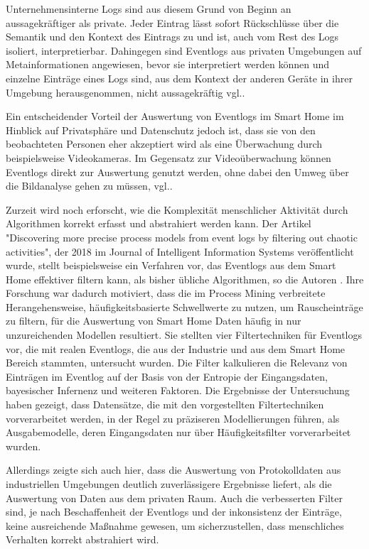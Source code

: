 Unternehmensinterne Logs sind aus diesem Grund von Beginn an aussagekräftiger als private. Jeder Eintrag lässt sofort Rückschlüsse über die Semantik und den Kontext des Eintrags zu und ist, auch vom Rest des Logs isoliert, interpretierbar. Dahingegen sind Eventlogs aus privaten Umgebungen auf Metainformationen angewiesen, bevor sie interpretiert werden können und einzelne Einträge eines Logs sind, aus dem Kontext der anderen Geräte in ihrer Umgebung herausgenommen, nicht aussagekräftig vgl.\cite{Jaroucheh2011}.

Ein entscheidender Vorteil der Auswertung von Eventlogs im Smart Home im Hinblick auf Privatsphäre und Datenschutz jedoch ist, dass sie von den beobachteten Personen eher akzeptiert wird als eine Überwachung durch beispielsweise Videokameras. Im Gegensatz zur Videoüberwachung können Eventlogs direkt zur Auswertung genutzt werden, ohne dabei den Umweg über die Bildanalyse gehen zu müssen, vgl.\cite{TaxSidorova}.

Zurzeit wird noch erforscht, wie die Komplexität menschlicher Aktivität durch Algorithmen korrekt erfasst und abstrahiert werden kann. Der Artikel "Discovering more precise process models from event logs by filtering out chaotic activities", der 2018 im Journal of Intelligent Information Systems veröffentlicht wurde, stellt beispielsweise ein Verfahren vor, das Eventlogs aus dem Smart Home effektiver filtern kann, als bisher übliche Algorithmen, so die Autoren \cite{Tax2019}. Ihre Forschung war dadurch motiviert, dass die im Process Mining verbreitete Herangehensweise, häufigkeitsbasierte Schwellwerte zu nutzen, um Rauscheinträge zu filtern, für die Auswertung von Smart Home Daten häufig in nur unzureichenden Modellen resultiert. 
Sie stellten vier Filtertechniken für Eventlogs vor, die mit realen Eventlogs, die aus der Industrie und aus dem Smart Home Bereich stammten, untersucht wurden. Die Filter kalkulieren die Relevanz von Einträgen im Eventlog auf der Basis von der Entropie der Eingangsdaten, bayesischer Infernenz und weiteren Faktoren. Die Ergebnisse der Untersuchung haben gezeigt, dass Datensätze, die mit den vorgestellten Filtertechniken vorverarbeitet werden, in der Regel zu präziseren Modellierungen führen, als Ausgabemodelle, deren Eingangsdaten nur über Häufigkeitsfilter vorverarbeitet wurden. 

Allerdings zeigte sich auch hier, dass die Auswertung von Protokolldaten aus industriellen Umgebungen deutlich zuverlässigere Ergebnisse liefert, als die Auswertung von Daten aus dem privaten Raum. Auch die verbesserten Filter sind, je nach Beschaffenheit der Eventlogs und der inkonsistenz der Einträge, keine ausreichende Maßnahme gewesen, um sicherzustellen, dass  menschliches Verhalten korrekt abstrahiert wird.

